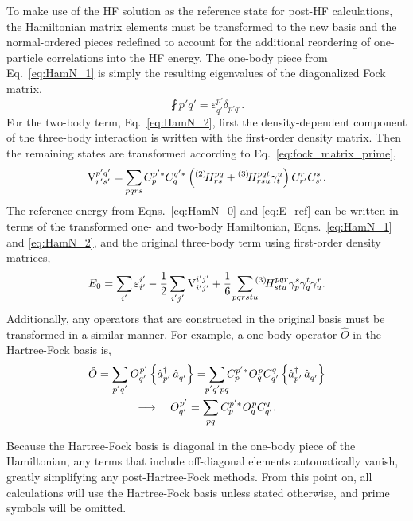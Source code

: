 \documentclass[thesis.tex]{subfiles}
\begin{document}
To make use of the HF solution as the reference state for post-HF calculations, the Hamiltonian matrix elements must be transformed to the new basis and the normal-ordered pieces redefined to account for the additional reordering of one-particle correlations into the HF energy.  The one-body piece from Eq.\ \eqref{eq:HamN_1} is simply the resulting eigenvalues of the diagonalized Fock matrix,
\begin{equation} \label{eq:HF_Ham_1}
  \fint{p'}{q'} = \varepsilon^{p'}_{q'}\delta_{p'q'}.
\end{equation}
For the two-body term, Eq.\ \eqref{eq:HamN_2}, first the density-dependent component of the three-body interaction is written with the first-order density matrix.  Then the remaining states are transformed according to Eq.\ \eqref{eq:fock_matrix_prime},
\begin{equation} \label{eq:HF_Ham_2}
  \vint{p'q'}{r's'} = \sum_{\mathclap{pqrs}} C^{p'*}_{p}C^{q'*}_{q}\left(\Hint{2}{pq}{rs} + \Hint{3}{pqt}{rsu}\gamma^{u}_{t}\right)C^{r}_{r'}C^{s}_{s'}.
\end{equation}
The reference energy from Eqns.\ \eqref{eq:HamN_0} and \eqref{eq:E_ref} can be written in terms of the transformed one- and two-body Hamiltonian, Eqns.\ \eqref{eq:HamN_1} and \eqref{eq:HamN_2}, and the original three-body term using first-order density matrices,
\begin{equation} \label{eq:EF_Ham_0}
  E_{0} = \sum_{\mathclap{i'}}\varepsilon^{i'}_{i'} - \frac{1}{2}\sum_{\mathclap{i'j'}}\vint{i'j'}{i'j'} + \frac{1}{6}\ \sum_{\mathclap{pqrstu}}\Hint{3}{pqr}{stu}\gamma^{s}_{p}\gamma^{t}_{q}\gamma^{r}_{u}.
\end{equation}
Additionally, any operators that are constructed in the original basis must be transformed in a similar manner.  For example, a one-body operator $\hat{O}$ in the Hartree-Fock basis is,
\begin{gather}
  \hat{O} = \sum_{\mathclap{p'q'}}\opint{}{p'}{q'}\normord{\co{p'}\ao{q'}} = \sum_{\mathclap{p'q'pq}}C^{p'*}_{p}\opint{}{p}{q}C^{q}_{q'}\normord{\co{p'}\ao{q'}} \notag \\
  \longrightarrow\ \ \ \opint{}{p'}{q'} = \sum_{\mathclap{pq}}C^{p'*}_{p}\opint{}{p}{q}C^{q}_{q'}.
\end{gather}

Because the Hartree-Fock basis is diagonal in the one-body piece of the Hamiltonian, any terms that include off-diagonal elements automatically vanish, greatly simplifying any post-Hartree-Fock methods.  From this point on, all calculations will use the Hartree-Fock basis unless stated otherwise, and prime symbols will be omitted.
\end{document}
